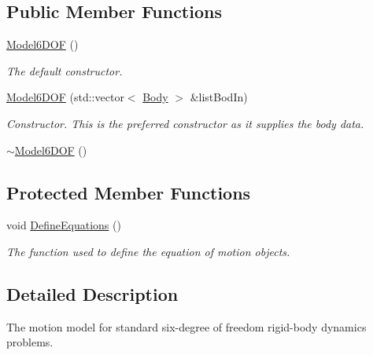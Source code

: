\subsection*{Public Member Functions}
\begin{DoxyCompactItemize}
\item 
\hypertarget{classosea_1_1ofreq_1_1_model6_d_o_f_a12492ff1097aa30bb6e1e700b56387c3}{\hyperlink{classosea_1_1ofreq_1_1_model6_d_o_f_a12492ff1097aa30bb6e1e700b56387c3}{Model6\-D\-O\-F} ()}\label{classosea_1_1ofreq_1_1_model6_d_o_f_a12492ff1097aa30bb6e1e700b56387c3}

\begin{DoxyCompactList}\small\item\em The default constructor. \end{DoxyCompactList}\item 
\hyperlink{classosea_1_1ofreq_1_1_model6_d_o_f_ad86b5d762a92454bb3be07a6e125c9c5}{Model6\-D\-O\-F} (std\-::vector$<$ \hyperlink{classosea_1_1ofreq_1_1_body}{Body} $>$ \&list\-Bod\-In)
\begin{DoxyCompactList}\small\item\em Constructor. This is the preferred constructor as it supplies the body data. \end{DoxyCompactList}\item 
\hyperlink{classosea_1_1ofreq_1_1_model6_d_o_f_a9559d74006712422d84356e210b406be}{$\sim$\-Model6\-D\-O\-F} ()
\end{DoxyCompactItemize}
\subsection*{Protected Member Functions}
\begin{DoxyCompactItemize}
\item 
void \hyperlink{classosea_1_1ofreq_1_1_model6_d_o_f_a0048de3d40838c93e2130ebb5130f3a1}{Define\-Equations} ()
\begin{DoxyCompactList}\small\item\em The function used to define the equation of motion objects. \end{DoxyCompactList}\end{DoxyCompactItemize}


\subsection{Detailed Description}
The motion model for standard six-\/degree of freedom rigid-\/body dynamics problems. 





